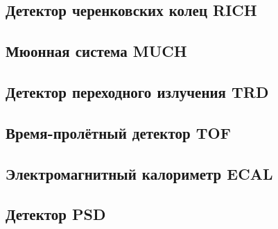 \subsection{Детектор черенковских колец RICH}\label{sec:secRICH}

\subsection{Мюонная система MUCH}\label{sec:secMUCH}

\subsection{Детектор переходного излучения TRD}\label{sec:secTRD}

\subsection{Время-пролётный детектор TOF}\label{sec:secTOF}

\subsection{Электромагнитный калориметр ECAL}\label{sec:secECAL}

\subsection{Детектор PSD}\label{sec:secPSD}
